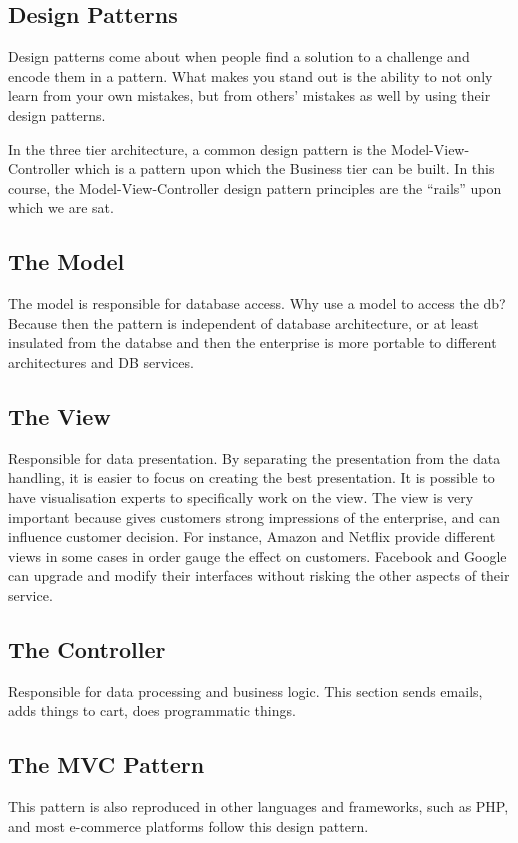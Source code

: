 \documentclass[11pt]{article}
\begin{document}
\subsection{Design Patterns}
Design patterns come about when people find a solution to a challenge and encode them in a pattern. What makes you stand out is the ability to not only learn from your own mistakes, but from others' mistakes as well by using their design patterns.

In the three tier architecture, a common design pattern is the Model-View-Controller which is a pattern upon which the Business tier can be built. In this course, the Model-View-Controller design pattern principles are the ``rails'' upon which we are sat.

\subsection{The Model}
The model is responsible for database access. Why use a model to access the db? Because then the pattern is independent of database architecture, or at least insulated from the databse and then the enterprise is more portable to different architectures and DB services.

\subsection{The View}
Responsible for data presentation. By separating the presentation from the data handling, it is easier to focus on creating the best presentation. It is possible to have visualisation experts to specifically work on the view. The view is very important because gives customers strong impressions of the enterprise, and can influence customer decision. For instance, Amazon and Netflix provide different views in some cases in order gauge the effect on customers. Facebook and Google can upgrade and modify their interfaces without risking the other aspects of their service.

\subsection{The Controller}
Responsible for data processing and business logic. This section sends emails, adds things to cart, does programmatic things.

\subsection{The MVC Pattern}
This pattern is also reproduced in other languages and frameworks, such as PHP, and most e-commerce platforms follow this design pattern.
\end{document}
